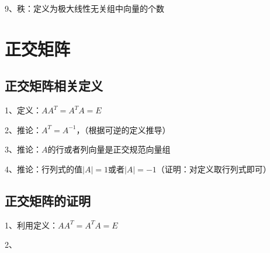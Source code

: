 9、秩：定义为极大线性无关组中向量的个数

\section{正交矩阵}



\subsection{正交矩阵相关定义}

1、定义：$AA^T=A^TA=E$

2、推论：$A^T=A^{-1}$，（根据可逆的定义推导）

3、推论：$A$的行或者列向量是正交规范向量组

4、推论：行列式的值$|A|=1$或者$|A|=-1$（证明：对定义取行列式即可）



\subsection{正交矩阵的证明}

1、利用定义：$AA^T=A^TA=E$

2、

